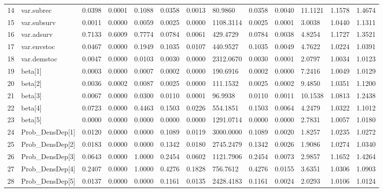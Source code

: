 \begin{table}[ht]
\begin{tabular}{rllllllllllll}
  14 & var.subrec &   0.0398 &   0.0001 &   0.1088 &  0.0358 &    0.0013 &   80.9860 &  0.0358 & 0.0040 & 11.1121 & 1.1578 & 1.4674 \\ 
  15 & var.subsurv &   0.0011 &   0.0000 &   0.0059 &  0.0025 &    0.0000 & 1108.3114 &  0.0025 & 0.0001 &  3.0038 & 1.0440 & 1.1311 \\ 
  16 & var.adsurv &   0.7133 &   0.6009 &   0.7774 &  0.0784 &    0.0061 &  429.4729 &  0.0784 & 0.0038 &  4.8254 & 1.1727 & 1.3521 \\ 
  17 & var.envstoc &   0.0467 &   0.0000 &   0.1949 &  0.1035 &    0.0107 &  440.9527 &  0.1035 & 0.0049 &  4.7622 & 1.0224 & 1.0391 \\ 
  18 & var.demstoc &   0.0047 &   0.0000 &   0.0103 &  0.0030 &    0.0000 & 2312.0670 &  0.0030 & 0.0001 &  2.0797 & 1.0034 & 1.0123 \\ 
  19 & beta[1] &   0.0003 &   0.0000 &   0.0007 &  0.0002 &    0.0000 &  190.6916 &  0.0002 & 0.0000 &  7.2416 & 1.0049 & 1.0129 \\ 
  20 & beta[2] &   0.0036 &   0.0002 &   0.0087 &  0.0025 &    0.0000 &  111.1532 &  0.0025 & 0.0002 &  9.4850 & 1.0351 & 1.1200 \\ 
  21 & beta[3] &   0.0067 &   0.0000 &   0.0300 &  0.0110 &    0.0001 &   96.9938 &  0.0110 & 0.0011 & 10.1538 & 1.0813 & 1.2438 \\ 
  22 & beta[4] &   0.0723 &   0.0000 &   0.4463 &  0.1503 &    0.0226 &  554.1851 &  0.1503 & 0.0064 &  4.2479 & 1.0322 & 1.1012 \\ 
  23 & beta[5] &   0.0000 &   0.0000 &   0.0000 &  0.0000 &    0.0000 & 1291.0714 &  0.0000 & 0.0000 &  2.7831 & 1.0057 & 1.0180 \\ 
  24 & Prob\_DensDep[1] &   0.0120 &   0.0000 &   0.0000 &  0.1089 &    0.0119 & 3000.0000 &  0.1089 & 0.0020 &  1.8257 & 1.0235 & 1.0272 \\ 
  25 & Prob\_DensDep[2] &   0.0183 &   0.0000 &   0.0000 &  0.1342 &    0.0180 & 2745.2479 &  0.1342 & 0.0026 &  1.9086 & 1.0274 & 1.0340 \\ 
  26 & Prob\_DensDep[3] &   0.0643 &   0.0000 &   1.0000 &  0.2454 &    0.0602 & 1121.7906 &  0.2454 & 0.0073 &  2.9857 & 1.1652 & 1.4264 \\ 
  27 & Prob\_DensDep[4] &   0.2407 &   0.0000 &   1.0000 &  0.4276 &    0.1828 &  756.7612 &  0.4276 & 0.0155 &  3.6351 & 1.0306 & 1.0903 \\ 
  28 & Prob\_DensDep[5] &   0.0137 &   0.0000 &   0.0000 &  0.1161 &    0.0135 & 2428.4183 &  0.1161 & 0.0024 &  2.0293 & 1.0106 & 1.0124 \\ 

\end{tabular}
\end{table}
